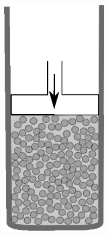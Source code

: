 \documentclass[usenames,dvipsnames]{beamer}
\begin{document}
\begin{frame}
\begin{columns}
\includegraphics[width=0.8\textwidth]{img/proceso/proceso2.eps}


\end{columns}
\end{frame}
\end{document}
